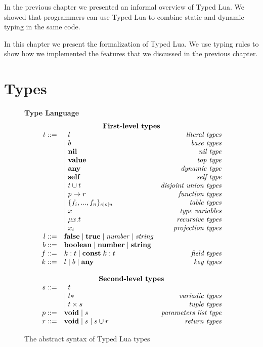 
In the previous chapter we presented an informal overview of Typed Lua.
We showed that programmers can use Typed Lua to combine static and dynamic
typing in the same code.

In this chapter we present the formalization of Typed Lua.
We use typing rules to show how we implemented the features that we
discussed in the previous chapter.

\section{Types}

\begin{figure}[!ht]
\textbf{Type Language}\\
\dstart
$$
\begin{array}{rlr}
\multicolumn{3}{c}{\textbf{First-level types}}\\
t ::= & \;\; l & \textit{literal types}\\
& | \; b & \textit{base types}\\
& | \; \Nil & \textit{nil type}\\
& | \; \Value & \textit{top type}\\
& | \; \Any & \textit{dynamic type}\\
& | \; \Self & \textit{self type}\\
& | \; t \cup t & \textit{disjoint union types}\\
& | \; p \rightarrow r & \textit{function types}\\
& | \; \{f_{i}, ..., f_{n}\}_{c|o|u} & \textit{table types}\\
& | \; x & \textit{type variables}\\
& | \; \mu x.t & \textit{recursive types}\\
& | \; x_{i} & \textit{projection types}\\
l ::= & \False \; | \; \True \; | \; {\it number} \; | \; {\it string} & \\
b ::= & \Boolean \; | \; \Number \; | \; \String & \\
f ::= & k:t \; | \; \Const \; k:t & \textit{field types}\\ 
k ::= & l \; | \; b \; | \; \Any & \textit{key types}\\
\multicolumn{3}{c}{}\\
\multicolumn{3}{c}{\textbf{Second-level types}}\\
s ::= & \;\; t &\\
& | \; t* & \textit{variadic types}\\
& | \; t \times s & \textit{tuple types}\\
p ::= & \Void \; | \; s & \textit{parameters list type}\\
r ::= & \Void \; | \; s \; | \; s \cup r & \textit{return types}\\
\end{array}
$$
\dend
\caption{The abstract syntax of Typed Lua types}
\label{fig:typelang}
\end{figure}

